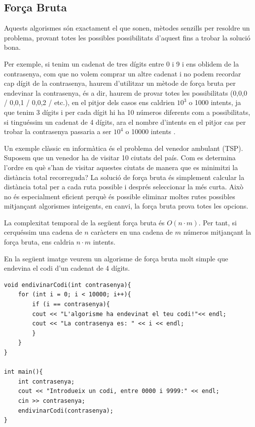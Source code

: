 \subsection{Força Bruta}

Aquests algorismes són exactament el que sonen, mètodes senzills per resoldre un problema, provant totes les possibles possibilitats d'aquest fins a trobar la solució bona.

Per exemple, si tenim un cadenat de tres dígits entre 0 i 9 i ens oblidem de la contrasenya, com que no volem comprar un altre cadenat i no podem recordar cap dígit de la contrasenya, haurem d'utilitzar un mètode de força bruta per endevinar la contrasenya, és a dir, haurem de provar totes les possibilitats (0,0,0 / 0,0,1 / 0,0,2 / etc.), en el pitjor dels casos ens caldrien $10^3$ o 1000 intents, ja que tenim 3 dígits i per cada dígit hi ha 10 números diferents com a possibilitats, si tinguéssim un cadenat de 4 dígits, ara el nombre d'intents en el pitjor cas per trobar la contrasenya passaria a ser $10^4$ o 10000 intents .

Un exemple clàssic en informàtica és el problema del venedor ambulant (TSP). Suposem que un venedor ha de visitar 10 ciutats del país. Com es determina l'ordre en què s'han de visitar aquestes ciutats de manera que es minimitzi la distància total recorreguda?
La solució de força bruta és simplement calcular la distància total per a cada ruta possible i després seleccionar la més curta. Això no és especialment eficient perquè és possible eliminar moltes rutes possibles mitjançant algorismes inte\lgem igents, en canvi, la força bruta prova totes les opcions.

La complexitat temporal de la següent força bruta és $O(n \cdot m)$. Per tant, si cerquéssim una cadena de $n$ caràcters en una cadena de $m$ números mitjançant la força bruta, ens caldria $n \cdot m$ intents.

En la següent imatge veurem un algorisme de força bruta molt simple que endevina el codi d'un cadenat de 4 dígits. \newline

\begin{lstlisting}
void endivinarCodi(int contrasenya){
    for (int i = 0; i < 10000; i++){
        if (i == contrasenya){
        cout << "L'algorisme ha endevinat el teu codi!"<< endl;
        cout << "La contrasenya es: " << i << endl;
        }
    }
}

int main(){
    int contrasenya;
    cout << "Introdueix un codi, entre 0000 i 9999:" << endl;
    cin >> contrasenya;
    endivinarCodi(contrasenya);
}
\end{lstlisting}

